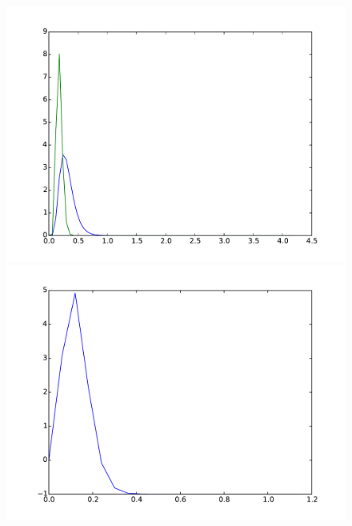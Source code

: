 \documentclass{article}
\begin{document}
\begin{figure}[htb]
	\centering
	\begin{minipage}{.3\textwidth}
		\centering
		\includegraphics[width=0.97\linewidth]{bootstrap-filter/global_complex_1_3.pdf}
	\end{minipage}
	\begin{minipage}{.3\textwidth}
		\centering
		\includegraphics[width=0.97\linewidth]{bootstrap-filter/relative_beginning_complex_1_3.pdf}
	\end{minipage}
	\begin{minipage}{.3\textwidth}
		\centering

\end{minipage}
\end{figure}
\end{document}
